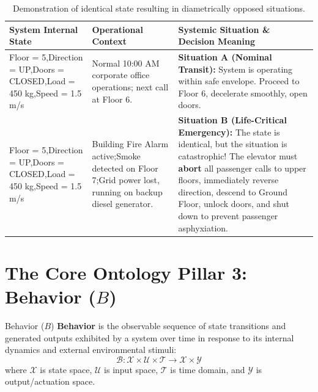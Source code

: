 \begin{table}[htbp]
\centering
\small
\renewcommand{\arraystretch}{1.3}
\begin{tabularx}{\textwidth}{p{3.2cm}p{4cm}X}
\toprule
\textbf{System Internal State} & \textbf{Operational Context} & \textbf{Systemic Situation \& Decision Meaning} \\
\midrule
Floor = 5,\newline Direction = UP,\newline Doors = CLOSED,\newline Load = 450 kg,\newline Speed = 1.5 m/s &
Normal 10:00 AM corporate office operations; next call at Floor 6. &
\textbf{Situation A (Nominal Transit):}\newline
System is operating within safe envelope. Proceed to Floor 6, decelerate smoothly, open doors. \\
\addlinespace
Floor = 5,\newline Direction = UP,\newline Doors = CLOSED,\newline Load = 450 kg,\newline Speed = 1.5 m/s &
Building Fire Alarm active;\newline Smoke detected on Floor 7;\newline Grid power lost, running on backup diesel generator. &
\textbf{Situation B (Life-Critical Emergency):}\newline
The state is identical, but the situation is catastrophic! The elevator must \textbf{abort} all passenger calls to upper floors, immediately reverse direction, descend to Ground Floor, unlock doors, and shut down to prevent passenger asphyxiation. \\
\bottomrule
\end{tabularx}
\caption{Demonstration of identical state resulting in diametrically opposed situations.}
\label{tab:state_vs_situation_elevator}
\end{table}

\section{The Core Ontology Pillar 3: Behavior (\texorpdfstring{$B$}{B})}
\label{sec:ontology_behavior}

\begin{definitionbox}{Behavior ($B$)}
\textbf{Behavior} is the observable sequence of state transitions and generated outputs exhibited by a system over time in response to its internal dynamics and external environmental stimuli:
\begin{equation}
    \mathcal{B}: \mathcal{X} \times \mathcal{U} \times \mathcal{T} \longrightarrow \mathcal{X} \times \mathcal{Y}
\end{equation}
where $\mathcal{X}$ is state space, $\mathcal{U}$ is input space, $\mathcal{T}$ is time domain, and $\mathcal{Y}$ is output/actuation space.
\end{definitionbox}

